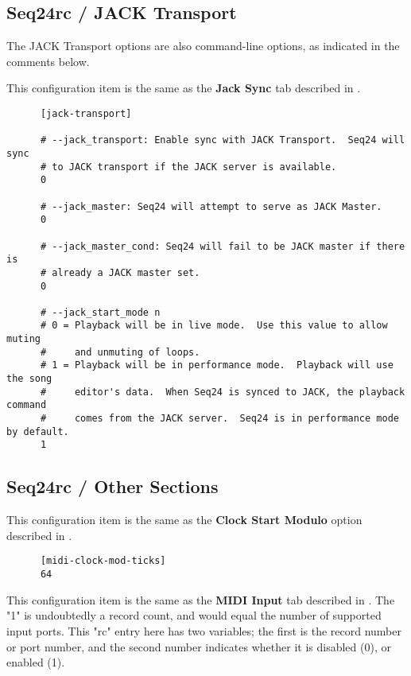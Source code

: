 \subsection{Seq24rc / JACK Transport}
\label{subsec:seq24_rc_file_jack_transport}

   The JACK Transport options are also command-line options, as indicated in
   the comments below.

   This configuration item is the same as the 
   \textbf{Jack Sync} tab described in
   .

   \begin{verbatim}
      [jack-transport]

      # --jack_transport: Enable sync with JACK Transport.  Seq24 will sync
      # to JACK transport if the JACK server is available.
      0

      # --jack_master: Seq24 will attempt to serve as JACK Master.
      0

      # --jack_master_cond: Seq24 will fail to be JACK master if there is
      # already a JACK master set.
      0

      # --jack_start_mode n
      # 0 = Playback will be in live mode.  Use this value to allow muting
      #     and unmuting of loops.
      # 1 = Playback will be in performance mode.  Playback will use the song
      #     editor's data.  When Seq24 is synced to JACK, the playback command
      #     comes from the JACK server.  Seq24 is in performance mode by default.
      1
   \end{verbatim}

\subsection{Seq24rc / Other Sections}
\label{subsec:seq24_rc_file_other_midi}

   This configuration item is the same as the
   \textbf{Clock Start Modulo} option described in
   .

   \begin{verbatim}
      [midi-clock-mod-ticks]
      64
   \end{verbatim}

   This configuration item is the same as the 
   \textbf{MIDI Input} tab described in
   .
   The "1" is undoubtedly a record count, and would equal the number of
   supported input ports.
   This "rc" entry here has two variables; the first is the record number or
   port number, and the second number indicates whether it is disabled (0),
   or enabled (1).

